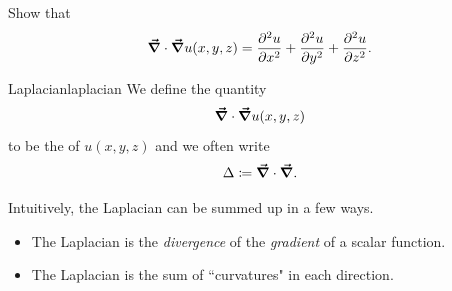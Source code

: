                \begin{exercise}
               Show that
               \[
               \boldsymbol{\vec{\nabla}} \cdot \boldsymbol{\vec{\nabla}} u(x,y,z) = \frac{\partial^2 u}{\partial x^2} + \frac{\partial^2 u}{\partial y^2} + \frac{\partial^2 u}{\partial z^2}.
               \]
               \end{exercise}
               
               \begin{df}{Laplacian}{laplacian}
               We define the quantity
               \[
               \boldsymbol{\vec{\nabla}} \cdot \boldsymbol{\vec{\nabla}} u(x,y,z)
               \]
               to be the  of $u(x,y,z)$ and we often write
               \[
               \Delta \coloneqq \boldsymbol{\vec{\nabla}} \cdot \boldsymbol{\vec{\nabla}}.
               \]
              
               \end{df}
               
               Intuitively, the Laplacian can be summed up in a few ways. 
               \begin{itemize}
                   \item The Laplacian is the \emph{divergence} of the \emph{gradient} of a scalar function.
                   \item The Laplacian is the sum of ``curvatures" in each direction.
               \end{itemize}
               
